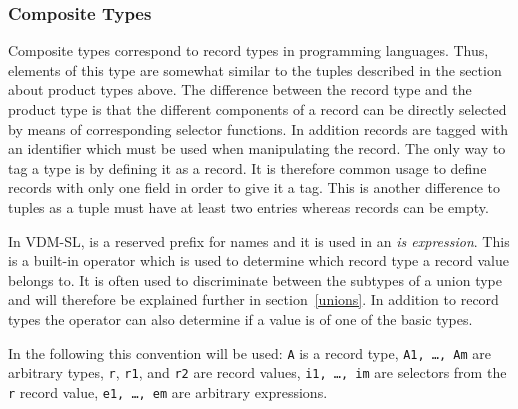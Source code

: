 \documentclass[\pformat,12pt]{article}
\newcommand{\vdmslpp}[2]{%
#1
}
\newcommand{\vdmsl}{VDM-SL}
\newcommand{\vdmpp}{VDM++}
\begin{document}
\subsubsection{Composite Types}\label{records}

Composite types correspond to record types in programming languages.
Thus, elements of this type are somewhat similar to the tuples
described in the section about product types above. The difference
between the record type and the product type is that the different
components of a record can be directly selected by means of
corresponding selector functions. In addition records are tagged with
an identifier which must be used when manipulating the record. The
only way to tag a type is by defining it as a record. It is therefore
common usage to define records with only one field in order to give it
a tag. This is another difference to tuples as a tuple must have at
least two entries whereas records can be empty.

In \vdmslpp{\vdmsl,}{\vdmpp,}  is a reserved prefix for names
and it is used in an {\it is expression}. This is a built-in operator
which is used to determine which record type a record value belongs to.
It is often used to discriminate between the subtypes of a union type
and will therefore be explained further in section~\ref{unions}. In
addition to record types the  operator can also determine if
a value is of one of the basic types.
 
In the following this convention will be used: {\tt A} is a record
type, {\tt A1, \ldots, Am} are arbitrary types, {\tt r}, {\tt r1}, and
{\tt r2} are record values, {\tt i1, \ldots, im} are selectors from
the {\tt r} record value, {\tt e1, \ldots, em} are arbitrary
expressions.
\end{document}
